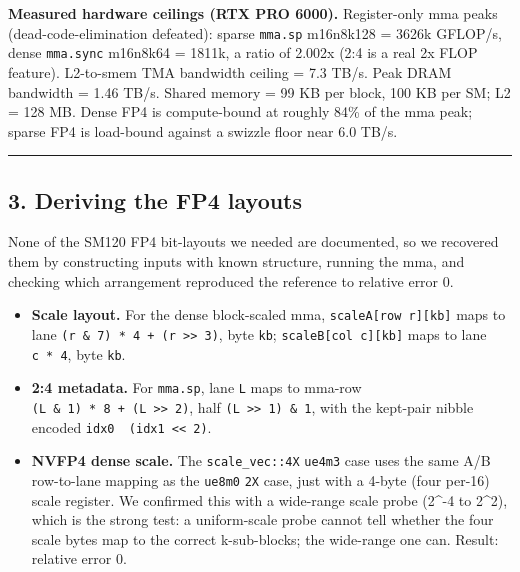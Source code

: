 \documentclass[
]{article}
\providecommand{\tightlist}{%
  \setlength{\itemsep}{0pt}\setlength{\parskip}{0pt}}
\begin{document}
\textbf{Measured hardware ceilings (RTX PRO 6000).} Register-only mma
peaks (dead-code-elimination defeated): sparse \texttt{mma.sp} m16n8k128
= 3626k GFLOP/s, dense \texttt{mma.sync} m16n8k64 = 1811k, a ratio of
2.002x (2:4 is a real 2x FLOP feature). L2-to-smem TMA bandwidth ceiling
= 7.3 TB/s. Peak DRAM bandwidth = 1.46 TB/s. Shared memory = 99 KB per
block, 100 KB per SM; L2 = 128 MB. Dense FP4 is compute-bound at roughly
84\% of the mma peak; sparse FP4 is load-bound against a swizzle floor
near 6.0 TB/s.

\begin{center}\rule{0.5\linewidth}{0.5pt}\end{center}

\subsection{3. Deriving the FP4 layouts}\label{deriving-the-fp4-layouts}

None of the SM120 FP4 bit-layouts we needed are documented, so we
recovered them by constructing inputs with known structure, running the
mma, and checking which arrangement reproduced the reference to relative
error 0.

\begin{itemize}
\tightlist
\item
  \textbf{Scale layout.} For the dense block-scaled mma,
  \texttt{scaleA{[}row\ r{]}{[}kb{]}} maps to lane
  \texttt{(r\ \&\ 7)\ *\ 4\ +\ (r\ \textgreater{}\textgreater{}\ 3)},
  byte \texttt{kb}; \texttt{scaleB{[}col\ c{]}{[}kb{]}} maps to lane
  \texttt{c\ *\ 4}, byte \texttt{kb}.
\item
  \textbf{2:4 metadata.} For \texttt{mma.sp}, lane \texttt{L} maps to
  mma-row
  \texttt{(L\ \&\ 1)\ *\ 8\ +\ (L\ \textgreater{}\textgreater{}\ 2)},
  half \texttt{(L\ \textgreater{}\textgreater{}\ 1)\ \&\ 1}, with the
  kept-pair nibble encoded
  \texttt{idx0\ \textbar{}\ (idx1\ \textless{}\textless{}\ 2)}.
\item
  \textbf{NVFP4 dense scale.} The \texttt{scale\_vec::4X} \texttt{ue4m3}
  case uses the same A/B row-to-lane mapping as the \texttt{ue8m0}
  \texttt{2X} case, just with a 4-byte (four per-16) scale register. We
  confirmed this with a wide-range scale probe (2\^{}-4 to 2\^{}2),
  which is the strong test: a uniform-scale probe cannot tell whether
  the four scale bytes map to the correct k-sub-blocks; the wide-range
  one can. Result: relative error 0.
\end{itemize}
\end{document}

